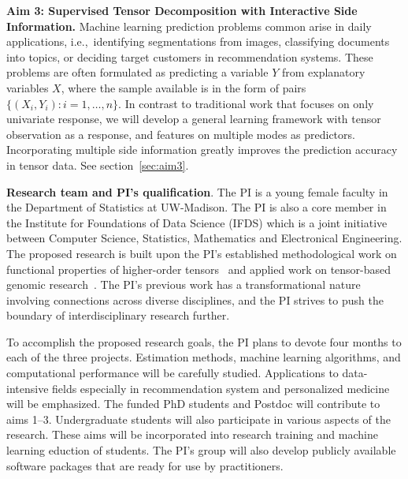 \documentclass[10pt]{article}
\theoremstyle{definition}
\theoremstyle{definition}
\theoremstyle{definition}
\begin{document}
\begin{enumerate}
{\bf Aim 3: Supervised Tensor Decomposition with Interactive Side Information.} Machine learning prediction problems common arise in daily applications, i.e.,\ identifying segmentations from images, classifying documents into topics, or deciding target customers in recommendation systems. These problems are often formulated as predicting a variable $Y$ from explanatory variables $X$, where the sample available is in the form of pairs $\{(X_i, Y_i): i=1,\ldots,n\}$. In contrast to traditional work that focuses on only univariate response, we will develop a general learning framework with tensor observation as a response, and features on multiple modes as predictors. Incorporating multiple side information greatly improves the prediction accuracy in tensor data. See section~\ref{sec:aim3}.

{\bf Research team and PI's qualification}. The PI is a young female faculty in the Department of Statistics at UW-Madison. The PI is also a core member in the Institute for Foundations of Data Science (IFDS) which is a joint initiative between Computer Science, Statistics, Mathematics and Electronical Engineering. The proposed research is built upon the PI’s established methodological work on functional properties of higher-order tensors~\cite{wang2017operator, wang2017tensor,zeng2019multiway,wang2018learning,lee2020tensor} and applied work on tensor-based genomic research~\cite{wang2019three,wang2018two}. The PI’s previous work has a transformational nature involving connections across diverse disciplines, and the PI strives to push the boundary of interdisciplinary research further.

To accomplish the proposed research goals, the PI plans to devote four months to each of the three projects. Estimation methods, machine learning algorithms, and computational performance will be carefully studied. Applications to data-intensive fields especially in recommendation system and personalized medicine will be emphasized. The funded PhD students and Postdoc will contribute to aims 1--3. Undergraduate students will also participate in various aspects of the research. These aims will be incorporated into research training and machine learning eduction of students. The PI’s group will also develop publicly available software packages that are ready for use by practitioners.



\end{enumerate}
\end{document}
